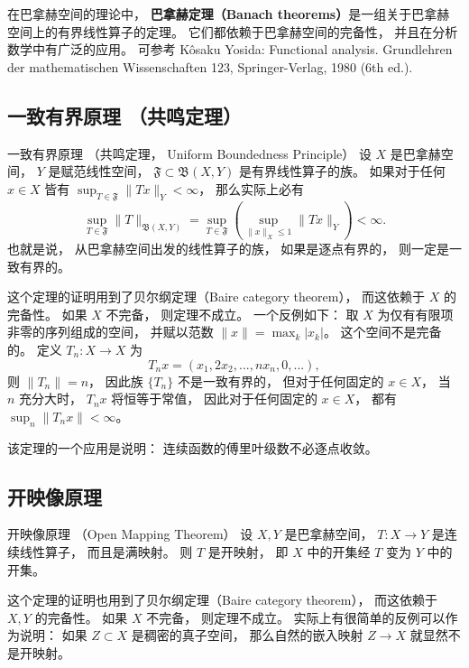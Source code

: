 

在巴拿赫空间的理论中， \textbf{巴拿赫定理（Banach theorems）}是一组关于巴拿赫空间上的有界线性算子的定理。 它们都依赖于巴拿赫空间的完备性， 并且在分析数学中有广泛的应用。 可参考 Kôsaku Yosida: Functional analysis. Grundlehren der mathematischen Wissenschaften 123, Springer-Verlag, 1980 (6th ed.).

\subsection{一致有界原理 （共鸣定理）}
\begin{theorem}{一致有界原理 （共鸣定理， Uniform Boundedness Principle）}
设 $X$ 是巴拿赫空间， $Y$ 是赋范线性空间， $\mathfrak{F}\subset\mathfrak{B}(X,Y)$ 是有界线性算子的族。 如果对于任何 $x\in X$ 皆有 $\sup_{T\in\mathfrak{F}}\|Tx\|_Y<\infty$， 那么实际上必有
$$
\sup_{T\in\mathfrak{F}}\|T\|_{\mathfrak{B}(X,Y)}
=\sup_{T\in\mathfrak{F}}\left(\sup_{\|x\|_X\leq 1}\|Tx\|_Y\right)<\infty.
$$
也就是说， 从巴拿赫空间出发的线性算子的族， 如果是逐点有界的， 则一定是一致有界的。 
\end{theorem}
这个定理的证明用到了贝尔纲定理（Baire category theorem）， 而这依赖于 $X$ 的完备性。 如果 $X$ 不完备， 则定理不成立。 一个反例如下： 取 $X$ 为仅有有限项非零的序列组成的空间， 并赋以范数 $\|x\|=\max_{k}|x_k|$。 这个空间不是完备的。 定义 $T_n:X\to X$ 为
$$
T_nx=(x_1,2x_2,...,nx_n,0,...),
$$
则 $\|T_n\|=n$， 因此族 $\{T_n\}$ 不是一致有界的， 但对于任何固定的 $x\in X$， 当 $n$ 充分大时， $T_nx$ 将恒等于常值， 因此对于任何固定的 $x\in X$， 都有 $\sup_n\|T_nx\|<\infty$。

该定理的一个应用是说明： 连续函数的傅里叶级数不必逐点收敛。 

\subsection{开映像原理}
\begin{theorem}{开映像原理 （Open Mapping Theorem）}
设 $X,Y$ 是巴拿赫空间， $T:X\to Y$ 是连续线性算子， 而且是满映射。 则 $T$ 是开映射， 即 $X$ 中的开集经 $T$ 变为 $Y$ 中的开集。
\end{theorem}

这个定理的证明也用到了贝尔纲定理（Baire category theorem）， 而这依赖于 $X,Y$ 的完备性。 如果 $X$ 不完备， 则定理不成立。 实际上有很简单的反例可以作为说明： 如果 $Z\subset X$ 是稠密的真子空间， 那么自然的嵌入映射 $Z\to X$ 就显然不是开映射。

